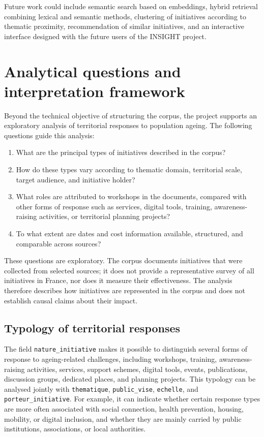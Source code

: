 \documentclass[
11pt,
english,
singlespacing,
headsepline,
]{MastersDoctoralThesis}
\begin{document}
Future work could include semantic search based on embeddings, hybrid retrieval
combining lexical and semantic methods, clustering of initiatives according to
thematic proximity, recommendation of similar initiatives, and an interactive
interface designed with the future users of the INSIGHT project.

\section{Analytical questions and interpretation framework}

Beyond the technical objective of structuring the corpus, the project supports
an exploratory analysis of territorial responses to population ageing. The
following questions guide this analysis:

\begin{enumerate}
    \item What are the principal types of initiatives described in the corpus?
    \item How do these types vary according to thematic domain, territorial
    scale, target audience, and initiative holder?
    \item What roles are attributed to workshops in the documents, compared with
    other forms of response such as services, digital tools, training,
    awareness-raising activities, or territorial planning projects?
    \item To what extent are dates and cost information available, structured,
    and comparable across sources?
\end{enumerate}

These questions are exploratory. The corpus documents initiatives that were
collected from selected sources; it does not provide a representative survey of
all initiatives in France, nor does it measure their effectiveness. The analysis
therefore describes how initiatives are represented in the corpus and does not
establish causal claims about their impact.

\subsection{Typology of territorial responses}

The field \texttt{nature\_initiative} makes it possible to distinguish several
forms of response to ageing-related challenges, including workshops, training,
awareness-raising activities, services, support schemes, digital tools, events,
publications, discussion groups, dedicated places, and planning projects. This
typology can be analysed jointly with \texttt{thematique},
\texttt{public\_vise}, \texttt{echelle}, and \texttt{porteur\_initiative}.
For example, it can indicate whether certain response types are more often
associated with social connection, health prevention, housing, mobility, or
digital inclusion, and whether they are mainly carried by public institutions,
associations, or local authorities.
\end{document}

